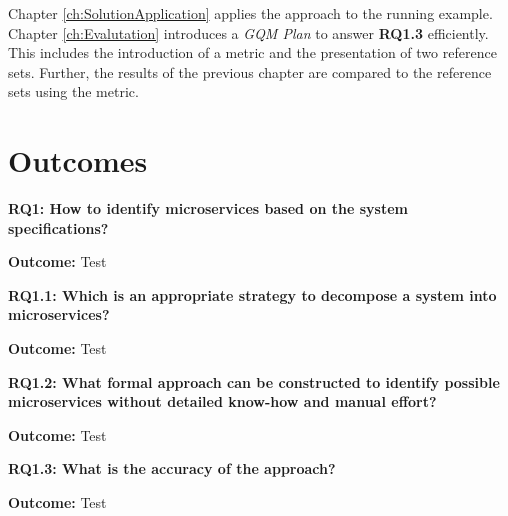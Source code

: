 Chapter \ref{ch:SolutionApplication} applies the approach to the running example. Chapter \ref{ch:Evalutation} introduces a \textit{GQM Plan} to answer \textbf{RQ1.3} efficiently. This includes the introduction of a metric and the presentation of two reference sets. Further, the results of the previous chapter are compared to the reference sets using the metric.


\section{Outcomes}


\vspace{0.5cm}
\par
\begingroup

\noindent
\textbf{RQ1: How to identify microservices based on the system specifications? }

\vspace{0.3cm}
\noindent
\textbf{Outcome:} Test

\endgroup
\vspace{0.5cm}


\vspace{0.5cm}
\par
\begingroup

\noindent
\textbf{RQ1.1: Which is an appropriate strategy to decompose a system into microservices? }

\vspace{0.3cm}
\noindent
\textbf{Outcome:} Test

\endgroup
\vspace{0.5cm}

\vspace{0.5cm}
\par
\begingroup

\noindent
\textbf{RQ1.2: What formal approach can be constructed to identify possible microservices without detailed know-how and manual effort? }

\vspace{0.3cm}
\noindent
\textbf{Outcome:} Test

\endgroup
\vspace{0.5cm}

\vspace{0.5cm}
\par
\begingroup

\noindent
\textbf{RQ1.3: What is the accuracy of the approach? }

\vspace{0.3cm}
\noindent
\textbf{Outcome:} Test

